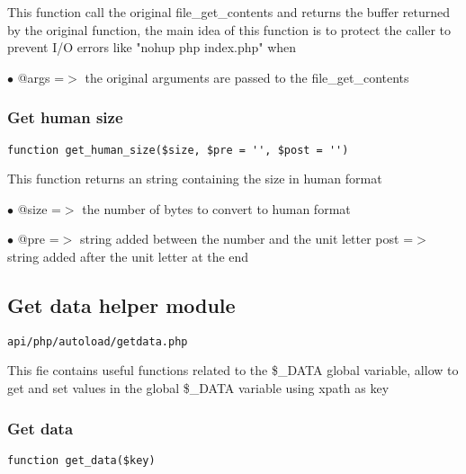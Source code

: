 \documentclass[a4paper]{article}
\begin{document}
This function call the original file\_get\_contents and returns the buffer
returned by the original function, the main idea of this function is to
protect the caller to prevent I/O errors like "nohup php index.php" when

\begin{compactitem}
\item[\color{myblue}$\bullet$] @args =$>$ the original arguments are passed to the file\_get\_contents
\end{compactitem}

\hypertarget{toc145}{}
\subsubsection{Get human size}

\begin{lstlisting}
function get_human_size($size, $pre = '', $post = '')
\end{lstlisting}

This function returns an string containing the size in human format

\begin{compactitem}
\item[\color{myblue}$\bullet$] @size =$>$ the number of bytes to convert to human format
\item[\color{myblue}$\bullet$] @pre  =$>$ string added between the number and the unit letter
post  =$>$ string added after the unit letter at the end
\end{compactitem}

\hypertarget{toc146}{}
\subsection{Get data helper module}

\begin{lstlisting}
api/php/autoload/getdata.php
\end{lstlisting}

This fie contains useful functions related to the \$\_DATA global variable, allow to get and set
values in the global \$\_DATA variable using xpath as key

\hypertarget{toc147}{}
\subsubsection{Get data}

\begin{lstlisting}
function get_data($key)
\end{lstlisting}
\end{document}
